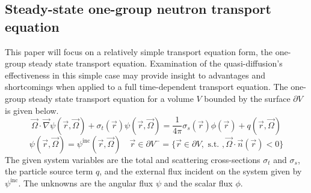 \documentclass{article}
\newcommand{\vr}{\vec{r}}
\newcommand{\vO}{\vec{\Omega}}
\newcommand{\vgrad}{\vec{\nabla}}
\newcommand{\sigt}{\sigma_t}
\newcommand{\sigs}{\sigma_s}
\begin{document}
\subsection{Steady-state one-group neutron transport equation}
This paper will focus on a relatively simple transport equation form, the one-group steady state transport equation. Examination of the quasi-diffusion's effectiveness in this simple case may provide insight to advantages and shortcomings when applied to a full time-dependent transport equation. The one-group steady state transport equation for a volume $V$ bounded by the surface $\partial V$ is given below.
\begin{equation}
\label{SS1GTE}
\vO \cdot \vgrad \psi(\vr,\vO) + \sigt(\vr) \psi(\vr,\vO) = \frac{1}{4 \pi} \sigs(\vr) \phi(\vr) + q(\vr,\vO) 
\end{equation}
\begin{equation}
\psi(\vr,\vO) = \psi^{\text{inc}}(\vr,\vO) \quad \vr \in \partial V^{-} = \{ \vr \in \partial V, \text{ s.t. }, \vO \cdot \vec{n}(\vr) < 0\}
\end{equation}
The given system variables are the total and scattering cross-sections $\sigt$ and $\sigs$, the particle source term $q$, and the external flux incident on the system given by $\psi^{\text{inc}}$. The unknowns are the angular flux $\psi$ and the scalar flux $\phi$.

\end{document}

